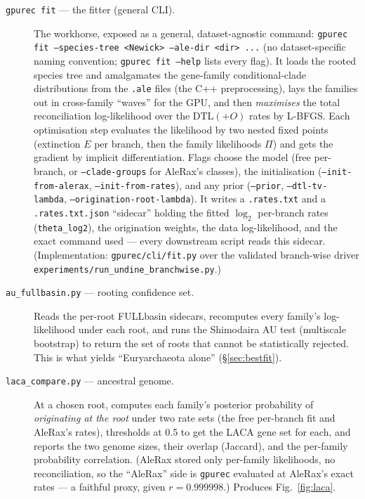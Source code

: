 \documentclass[11pt]{article}
\newcommand{\code}[1]{\texttt{\small #1}}
\begin{document}
\begin{description}
\item[\code{gpurec fit} --- the fitter (general CLI).] The workhorse, exposed as a general,
  dataset-agnostic command: \code{gpurec fit --species-tree <Newick> --ale-dir <dir> ...}
  (no dataset-specific naming convention; \code{gpurec fit --help} lists every flag). It loads
  the rooted species tree and amalgamates the gene-family conditional-clade distributions from
  the \code{.ale} files (the C++ preprocessing), lays the families out in cross-family
  ``waves'' for the GPU, and then \emph{maximises} the total reconciliation log-likelihood over
  the DTL$(+O)$ rates by L-BFGS. Each optimisation step evaluates the likelihood by two nested
  fixed points (extinction $E$ per branch, then the family likelihoods $\Pi$) and gets the
  gradient by implicit differentiation. Flags choose the model (free per-branch, or
  \code{--clade-groups} for AleRax's classes), the initialisation (\code{--init-from-alerax},
  \code{--init-from-rates}), and any prior (\code{--prior}, \code{--dtl-tv-lambda},
  \code{--origination-root-lambda}). It writes a \code{.rates.txt} and a \code{.rates.txt.json}
  ``sidecar'' holding the fitted $\log_2$ per-branch rates (\code{theta\_log2}), the
  origination weights, the data log-likelihood, and the exact command used --- every downstream
  script reads this sidecar. (Implementation: \code{gpurec/cli/fit.py} over the validated
  branch-wise driver \code{experiments/run\_undine\_branchwise.py}.)

\item[\code{au\_fullbasin.py} --- rooting confidence set.] Reads the per-root FULLbasin
  sidecars, recomputes every family's log-likelihood under each root, and runs the Shimodaira
  AU test (multiscale bootstrap) to return the set of roots that cannot be statistically
  rejected. This is what yields ``Euryarchaeota alone'' (\S\ref{sec:bestfit}).

\item[\code{laca\_compare.py} --- ancestral genome.] At a chosen root, computes each family's
  posterior probability of \emph{originating at the root} under two rate sets (the free
  per-branch fit and AleRax's rates), thresholds at 0.5 to get the LACA gene set for each,
  and reports the two genome sizes, their overlap (Jaccard), and the per-family
  probability correlation. (AleRax stored only per-family likelihoods, no reconciliation, so
  the ``AleRax'' side is \code{gpurec} evaluated at AleRax's exact rates --- a faithful
  proxy, given $r=0.999998$.) Produces Fig.~\ref{fig:laca}.


\end{description}
\end{document}
